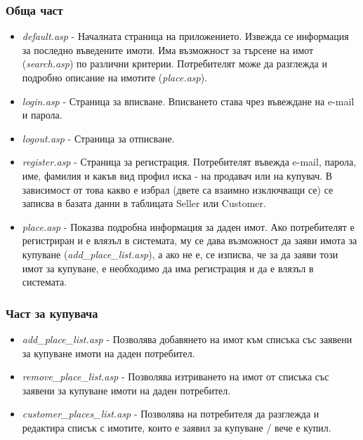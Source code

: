 \documentclass[a4paper,12pt, leqno]{article}
\begin{document}
\subsubsection{Обща част}
\begin{itemize}
 \item \textit{default.asp} - Началната страница на приложението. Извежда се информация за последно въведените имоти. 
Има възможност за търсене на имот (\textit{search.asp}) по различни критерии. Потребителят може да разглежда и подробно описание 
на имотите (\textit{place.asp}).
 \item \textit{login.asp} - Страница за вписване. Вписването става чрез въвеждане на e-mail и парола.
 \item \textit{logout.asp} - Страница за отписване.
 \item \textit{register.asp} - Страница за регистрация. Потребителят въвежда e-mail, парола, име, фамилия и
какъв вид профил иска - на продавач или на купувач. В зависимост от това какво е избрал (двете са взаимно изключващи се) 
се записва в базата данни в таблицата Seller или Customer.
 \item \textit{place.asp} - Показва подробна информация за даден имот. Ако потребителят е регистриран и 
е влязъл в системата, му се дава възможност да заяви имота за купуване (\textit{add\_place\_list.asp}), а ако не е, 
се изписва, че за да заяви този имот за купуване, е необходимо да има регистрация и да е влязъл в системата.
\end{itemize}


\subsubsection{Част за купувача}
\begin{itemize}
 \item \textit{add\_place\_list.asp} - Позволява добавянето на имот към списъка със заявени за купуване имоти на даден
потребител.
 \item \textit{remove\_place\_list.asp} - Позволява изтриването на имот от списъка със заявени за купуване имоти на 
даден потребител.
 \item \textit{customer\_places\_list.asp} - Позволява на потребителя да разглежда и редактира списък с имотите, 
които е заявил за купуване / вече е купил.
\end{itemize}
\end{document}
